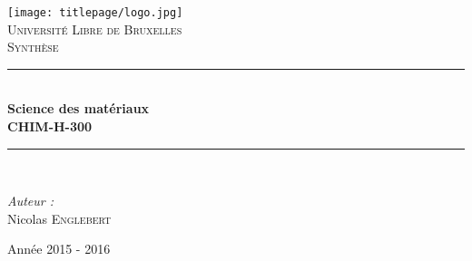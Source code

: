 \AddToShipoutPicture*{\BackgroundPic}
\begin{titlepage}
\begin{center}	
	
	\newcommand{\HRule}{\rule{\linewidth}{0.5mm}}   			            %
	\texttt{[image: titlepage/logo.jpg]}~\\[1cm]				%

	\textsc{\LARGE Université Libre de Bruxelles}\\[1.5cm]
	\textsc{\Large Synthèse}\\[0.5cm]

	\HRule \\[0.4cm]
	{ \huge \bfseries Science des matériaux \ \\CHIM-H-300 \\[0.4cm] }


	\HRule \\[1.5cm]
		\begin{minipage}{0.4\textwidth}
		\begin{flushleft} \large
		
		\emph{Auteur :}\\
			Nicolas \textsc{Englebert}

			\end{flushleft}
			\end{minipage}
			\begin{minipage}{0.4\textwidth}
			\begin{flushright} \large
			\end{flushright}
		\end{minipage}

	\vfill

{\large Année 2015 - 2016}

\end{center}
\end{titlepage}
